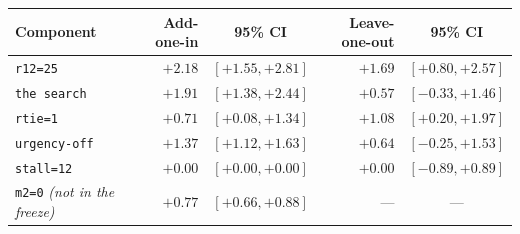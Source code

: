 \begin{tabular}{lrcrc}
\toprule
Component & Add-one-in & 95\% CI & Leave-one-out & 95\% CI \\
\midrule
\texttt{r12=25} & $+2.18$ & $[+1.55, +2.81]$ & $+1.69$ & $[+0.80, +2.57]$ \\
\texttt{the search} & $+1.91$ & $[+1.38, +2.44]$ & $+0.57$ & $[-0.33, +1.46]$ \\
\texttt{rtie=1} & $+0.71$ & $[+0.08, +1.34]$ & $+1.08$ & $[+0.20, +1.97]$ \\
\texttt{urgency-off} & $+1.37$ & $[+1.12, +1.63]$ & $+0.64$ & $[-0.25, +1.53]$ \\
\texttt{stall=12} & $+0.00$ & $[+0.00, +0.00]$ & $+0.00$ & $[-0.89, +0.89]$ \\
\texttt{m2=0} \textit{(not in the freeze)} & $+0.77$ & $[+0.66, +0.88]$ & --- & --- \\
\bottomrule
\end{tabular}

